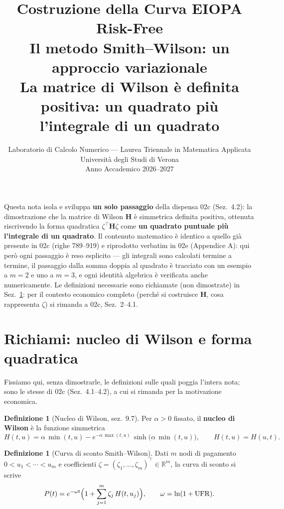 \documentclass[11pt,a4paper]{article}
\title{%
  \textbf{Costruzione della Curva EIOPA Risk-Free}\\[6pt]
  \large Il metodo Smith--Wilson: un approccio variazionale\\[4pt]
  \normalsize La matrice di Wilson è definita positiva: un quadrato più l'integrale di un quadrato\\[2pt]
}
\author{Laboratorio di Calcolo Numerico --- Laurea Triennale in Matematica Applicata\\
  Universit\`a degli Studi di Verona\\[2pt]
  Anno Accademico 2026--2027}
\date{}
\theoremstyle{plain}
\theoremstyle{definition}
\newtheorem{definizione}[teorema]{Definizione}
\theoremstyle{remark}
\newcommand{\UFR}{\ensuremath{\mathrm{UFR}}}
\newcommand{\Hmat}{\mathbf{H}}
\newcommand{\transp}{^{\!\top}}
\begin{document}
\maketitle
\tableofcontents
\newpage

\noindent
Questa nota isola e sviluppa \textbf{un solo passaggio} della dispensa 02c (Sez.~4.2): la
dimostrazione che la matrice di Wilson $\Hmat$ è simmetrica definita positiva, ottenuta
riscrivendo la forma quadratica $\zeta\transp\Hmat\zeta$ come \textbf{un quadrato puntuale più
l'integrale di un quadrato}. Il contenuto matematico è identico a quello già presente in 02c
(righe 789--919) e riprodotto verbatim in 02e (Appendice A): qui però ogni passaggio è reso
esplicito --- gli integrali sono calcolati termine a termine, il passaggio dalla somma doppia
al quadrato è tracciato con un esempio a $m=2$ e uno a $m=3$, e ogni identità algebrica è
verificata anche numericamente. Le definizioni necessarie sono richiamate (non dimostrate) in
Sez.~\ref{sec:richiami}: per il contesto economico completo (perché si costruisce $\Hmat$, cosa
rappresenta $\zeta$) si rimanda a 02c, Sez.~2--4.1.

\section{Richiami: nucleo di Wilson e forma quadratica}
\label{sec:richiami}

Fissiamo qui, senza dimostrarle, le definizioni sulle quali poggia l'intera nota; sono le
stesse di 02c (Sez.~4.1--4.2), a cui si rimanda per la motivazione economica.

\begin{definizione}[Nucleo di Wilson, \cite{eiopa2025} sez.~9.7]
Per $\alpha>0$ fissato, il \textbf{nucleo di Wilson} è la funzione simmetrica
\[
  H(t,u) = \alpha\,\min(t,u) - e^{-\alpha\,\max(t,u)}\,\sinh\!\bigl(\alpha\,\min(t,u)\bigr),
  \qquad H(t,u)=H(u,t).
\]
\end{definizione}

\begin{definizione}[Curva di sconto Smith--Wilson]
Dati $m$ nodi di pagamento $0<u_1<\cdots<u_m$ e coefficienti $\zeta=(\zeta_1,\ldots,\zeta_m)\transp
\in\mathbb{R}^m$, la curva di sconto si scrive
\[
  P(t) = e^{-\omega t}\Bigl(1 + \sum_{j=1}^m \zeta_j\, H(t,u_j)\Bigr),
  \qquad \omega=\ln(1+\UFR).
\]
\end{definizione}
\end{document}
